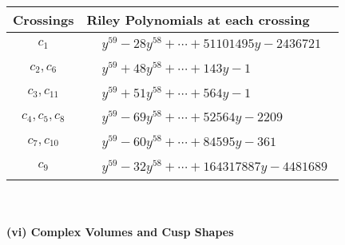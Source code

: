 \documentclass[1p]{elsarticle_modified}
\theoremstyle{definition}
\begin{document}
\begin{tabular}{m{50pt}|m{274pt}}
Crossings & \hspace{64pt}Riley Polynomials at each crossing \\
\hline $$\begin{aligned}c_{1}\end{aligned}$$&$\begin{aligned}
&y^{59}-28 y^{58}+\cdots+51101495 y-2436721
\end{aligned}$\\
\hline $$\begin{aligned}c_{2},c_{6}\end{aligned}$$&$\begin{aligned}
&y^{59}+48 y^{58}+\cdots+143 y-1
\end{aligned}$\\
\hline $$\begin{aligned}c_{3},c_{11}\end{aligned}$$&$\begin{aligned}
&y^{59}+51 y^{58}+\cdots+564 y-1
\end{aligned}$\\
\hline $$\begin{aligned}c_{4},c_{5},c_{8}\end{aligned}$$&$\begin{aligned}
&y^{59}-69 y^{58}+\cdots+52564 y-2209
\end{aligned}$\\
\hline $$\begin{aligned}c_{7},c_{10}\end{aligned}$$&$\begin{aligned}
&y^{59}-60 y^{58}+\cdots+84595 y-361
\end{aligned}$\\
\hline $$\begin{aligned}c_{9}\end{aligned}$$&$\begin{aligned}
&y^{59}-32 y^{58}+\cdots+164317887 y-4481689
\end{aligned}$\\
\hline
\end{tabular}\\~\\
\newpage\flushleft \textbf{(vi) Complex Volumes and Cusp Shapes}
\end{document}
